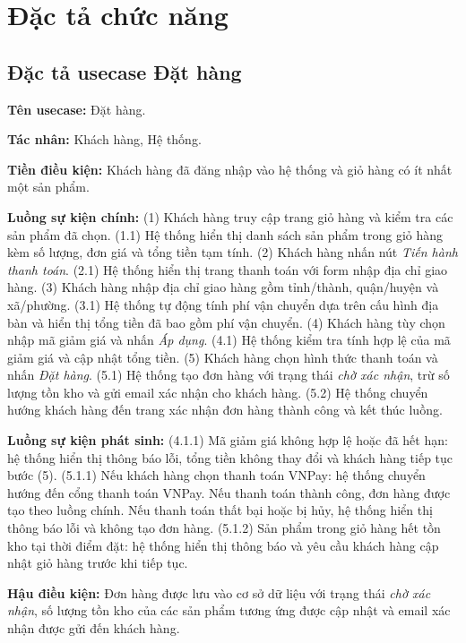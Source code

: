\documentclass[../DoAn.tex]{subfiles}
\begin{document}
  \section{Đặc tả chức năng}
  \label{section:2.3}

  \subsection{Đặc tả usecase Đặt hàng}
  \label{subsection:2.3.1}
  \hfill

  \textbf{Tên usecase:} Đặt hàng.

  \textbf{Tác nhân:} Khách hàng, Hệ thống.

  \textbf{Tiền điều kiện:} Khách hàng đã đăng nhập vào hệ thống và giỏ hàng có ít
  nhất một sản phẩm.

  \textbf{Luồng sự kiện chính:}
  (1) Khách hàng truy cập trang giỏ hàng và kiểm tra các sản phẩm đã chọn.
  (1.1) Hệ thống hiển thị danh sách sản phẩm trong giỏ hàng kèm số lượng, đơn giá
  và tổng tiền tạm tính.
  (2) Khách hàng nhấn nút \textit{Tiến hành thanh toán}.
  (2.1) Hệ thống hiển thị trang thanh toán với form nhập địa chỉ giao hàng.
  (3) Khách hàng nhập địa chỉ giao hàng gồm tỉnh/thành, quận/huyện và xã/phường.
  (3.1) Hệ thống tự động tính phí vận chuyển dựa trên cấu hình địa bàn và hiển
  thị tổng tiền đã bao gồm phí vận chuyển.
  (4) Khách hàng tùy chọn nhập mã giảm giá và nhấn \textit{Áp dụng}.
  (4.1) Hệ thống kiểm tra tính hợp lệ của mã giảm giá và cập nhật tổng tiền.
  (5) Khách hàng chọn hình thức thanh toán và nhấn \textit{Đặt hàng}.
  (5.1) Hệ thống tạo đơn hàng với trạng thái \textit{chờ xác nhận}, trừ số lượng
  tồn kho và gửi email xác nhận cho khách hàng.
  (5.2) Hệ thống chuyển hướng khách hàng đến trang xác nhận đơn hàng thành công
  và kết thúc luồng.

  \textbf{Luồng sự kiện phát sinh:}
  (4.1.1) Mã giảm giá không hợp lệ hoặc đã hết hạn: hệ thống hiển thị thông báo
  lỗi, tổng tiền không thay đổi và khách hàng tiếp tục bước (5).
  (5.1.1) Nếu khách hàng chọn thanh toán VNPay: hệ thống chuyển hướng đến cổng
  thanh toán VNPay. Nếu thanh toán thành công, đơn hàng được tạo theo luồng chính.
  Nếu thanh toán thất bại hoặc bị hủy, hệ thống hiển thị thông báo lỗi và không
  tạo đơn hàng.
  (5.1.2) Sản phẩm trong giỏ hàng hết tồn kho tại thời điểm đặt: hệ thống hiển
  thị thông báo và yêu cầu khách hàng cập nhật giỏ hàng trước khi tiếp tục.

  \textbf{Hậu điều kiện:} Đơn hàng được lưu vào cơ sở dữ liệu với trạng thái
  \textit{chờ xác nhận}, số lượng tồn kho của các sản phẩm tương ứng được cập nhật
  và email xác nhận được gửi đến khách hàng.
\end{document}
